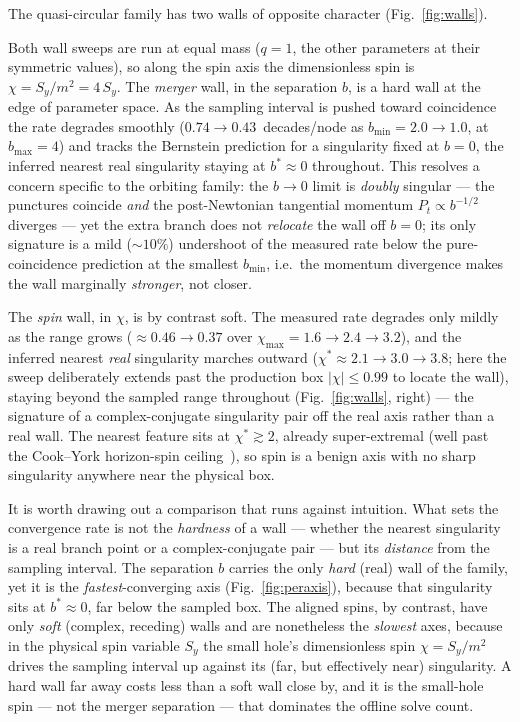 \documentclass[
  aps,
  prd,
  twocolumn,
  amsmath,
  amssymb,
  nofootinbib,
  superscriptaddress,
  floatfix,
]{revtex4-2}
\begin{document}
The quasi-circular family has two walls of opposite character
(Fig.~\ref{fig:walls}).

Both wall sweeps are run at equal mass ($q=1$, the other parameters at their
symmetric values), so along the spin axis the dimensionless spin is
$\chi=S_y/m^2=4\,S_y$.
The \emph{merger} wall, in the separation $b$, is a hard wall at the edge of
parameter space. As the sampling interval is pushed toward coincidence the rate
degrades smoothly ($0.74\to0.43$~decades/node as $b_{\min}=2.0\to1.0$, at
$b_{\max}=4$) and tracks the Bernstein prediction for a singularity fixed at
$b=0$, the inferred nearest real singularity staying at $b^\ast\approx0$
throughout. This resolves a concern
specific to the orbiting family: the $b\to0$ limit is \emph{doubly} singular --- the
punctures coincide \emph{and} the post-Newtonian tangential momentum
$P_t\propto b^{-1/2}$ diverges --- yet the extra branch does not \emph{relocate} the
wall off $b=0$; its only signature is a mild ($\sim\!10\%$) undershoot of the measured
rate below the pure-coincidence prediction at the smallest $b_{\min}$, i.e.\ the
momentum divergence makes the wall marginally \emph{stronger}, not closer.

The \emph{spin} wall, in $\chi$, is by contrast soft. The measured rate degrades
only mildly as the range grows ($\approx0.46\to0.37$ over
$\chi_{\max}=1.6\to2.4\to3.2$), and the inferred nearest \emph{real}
singularity marches outward ($\chi^\ast\approx2.1\to3.0\to3.8$; here the sweep
deliberately extends past the production box $|\chi|\le0.99$ to locate the wall),
staying beyond the sampled range throughout
(Fig.~\ref{fig:walls}, right) --- the signature of a
complex-conjugate singularity pair off the real axis rather than a real wall. The
nearest feature sits at $\chi^\ast\gtrsim2$, already super-extremal (well past the
Cook--York horizon-spin ceiling~\cite{CookYork1990}), so spin is a benign axis with
no sharp singularity anywhere near the physical box.

It is worth drawing out a comparison that runs against intuition. What sets the
convergence rate is not the \emph{hardness} of a wall --- whether the nearest
singularity is a real branch point or a complex-conjugate pair --- but its
\emph{distance} from the sampling interval. The separation $b$ carries the only
\emph{hard} (real) wall of the family, yet it is the \emph{fastest}-converging
axis (Fig.~\ref{fig:peraxis}), because that singularity sits at $b^\ast\approx0$,
far below the sampled box. The aligned spins, by contrast, have only \emph{soft}
(complex, receding) walls and are nonetheless the \emph{slowest} axes, because in
the physical spin variable $S_y$ the small hole's dimensionless spin
$\chi=S_y/m^2$ drives the sampling interval up against its (far, but effectively
near) singularity. A hard wall far away costs less than a soft wall close by, and
it is the small-hole spin --- not the merger separation --- that dominates the
offline solve count.
\end{document}

